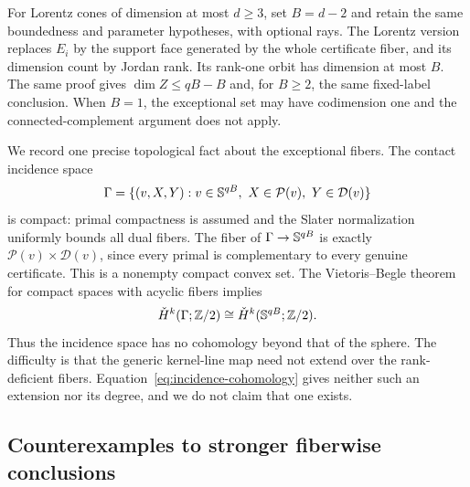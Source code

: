 For Lorentz cones of dimension at most $d\geq3$, set $B=d-2$ and
retain the same boundedness and parameter hypotheses, with optional rays.
The Lorentz version replaces $E_i$ by the support face generated by the
whole certificate fiber, and its dimension count by Jordan rank. Its
rank-one orbit has dimension at most $B$. The same proof gives
$\dim Z\leq qB-B$ and, for $B\geq2$, the same fixed-label conclusion.
When $B=1$, the exceptional set may have codimension one and the
connected-complement argument does not apply.

We record one precise topological fact about the exceptional fibers.
The contact incidence space
\[
 \Gamma=\{(v,X,Y):v\in\mathbb S^{qB},\ X\in\mathcal P(v),\
 Y\in\mathcal D(v)\}
\]
is compact: primal compactness is assumed and the Slater normalization
uniformly bounds all dual fibers. The fiber of $\Gamma\to\mathbb S^{qB}$
is exactly $\mathcal P(v)\times\mathcal D(v)$, since every primal is
complementary to every genuine certificate. This is a nonempty compact
convex set. The Vietoris--Begle theorem for compact spaces with acyclic
fibers \citep{Begle1950} implies
\begin{equation}\label{eq:incidence-cohomology}
 \check H^k(\Gamma;\mathbb Z/2)
 \cong\check H^k(\mathbb S^{qB};\mathbb Z/2).
\end{equation}
Thus the incidence space has no cohomology beyond that of the sphere.
The difficulty is that the generic kernel-line map need not extend over
the rank-deficient fibers. Equation~\eqref{eq:incidence-cohomology}
gives neither such an extension nor its degree, and we do not claim
that one exists.

\subsection{Counterexamples to stronger fiberwise conclusions}

